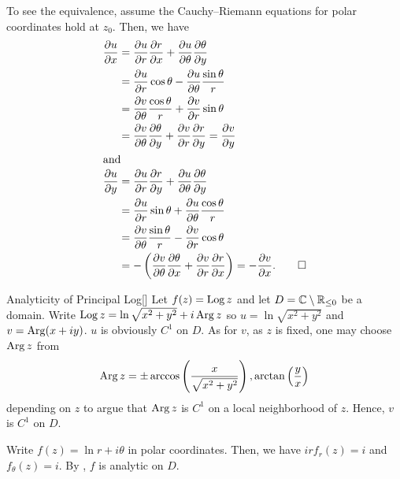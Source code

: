 \documentclass[../complex_variables_1.tex]{subfiles}
\begin{document}
\begin{myproof}[Proof]
    To see the equivalence, assume the Cauchy--Riemann equations for polar coordinates hold at \(z_0\).
    Then, we have
    \begin{align*}
        \frac{\partial u}{\partial x}
        &= \frac{\partial u}{\partial r}\frac{\partial r}{\partial x} + \frac{\partial u}{\partial \theta}\frac{\partial \theta}{\partial y} \\
        &= \frac{\partial u}{\partial r} \cos\theta - \frac{\partial u}{\partial \theta}\frac{\sin\theta}{r} \\
        &= \frac{\partial v}{\partial \theta} \frac{\cos\theta}{r} + \frac{\partial v}{\partial r} \sin\theta \\
        &= \frac{\partial v}{\partial \theta} \frac{\partial\theta}{\partial y} + \frac{\partial v}{\partial r} \frac{\partial r}{\partial y}
        = \frac{\partial v}{\partial y} \\
        \shortintertext{and}
        \frac{\partial u}{\partial y}
        &= \frac{\partial u}{\partial r}\frac{\partial r}{\partial y} + \frac{\partial u}{\partial \theta}\frac{\partial \theta}{\partial y} \\
        &= \frac{\partial u}{\partial r}\sin\theta + \frac{\partial u}{\partial \theta}\frac{\cos\theta}{r} \\
        &= \frac{\partial v}{\partial \theta}\frac{\sin\theta}{r} - \frac{\partial v}{\partial r}\cos\theta \\
        &= - \left(\frac{\partial v}{\partial \theta}\frac{\partial\theta}{\partial x} + \frac{\partial v}{\partial r}\frac{\partial r}{\partial x} \right)
        = -\frac{\partial v}{\partial x}\text.\qedhere
    \end{align*}
\end{myproof}

\begin{Example}{Analyticity of Principal Log}[]
    Let \(f(z) = \operatorname{Log} z\) and let \(D = \CC \setminus \RR_{\le 0}\)
    be a domain.
    Write \(\operatorname{Log} z = \ln\sqrt{x^2+y^2} + i\operatorname{Arg} z\)
    so \(u = \ln\sqrt{x^2+y^2}\) and \(v = \operatorname{Arg}(x+iy)\). \(u\) is obviously \(C^1\) on \(D\).
    As for \(v\), as \(z\) is fixed, one may choose \(\operatorname{Arg} z\) from
    \[
        \operatorname{Arg} z = \pm\arccos\left(\frac{x}{\sqrt{x^2+y^2}}\right),
        \arctan\left(\frac{y}{x}\right)
    \]
    depending on \(z\) to argue that \(\operatorname{Arg} z\) is \(C^1\) on
    a local neighborhood of \(z\).
    Hence, \(v\) is \(C^1\) on \(D\).

    Write \(f(z) = \ln r + i\theta\) in polar coordinates.
    Then, we have \(irf_r(z) = i\) and \(f_\theta(z) = i\).
    By , \(f\) is analytic on \(D\).
\end{Example}
\end{document}

